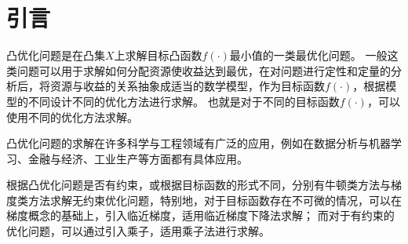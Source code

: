 \section{引言}
凸优化问题是在凸集$X$上求解目标凸函数$f(\cdot)$最小值的一类最优化问题。
一般这类问题可以用于求解如何分配资源使收益达到最优，在对问题进行定性和定量的分析后，将资源与收益的关系抽象成适当的数学模型，作为目标函数$f(\cdot)$，根据模型的不同设计不同的优化方法进行求解。
也就是对于不同的目标函数$f(\cdot)$，可以使用不同的优化方法求解。

凸优化问题的求解在许多科学与工程领域有广泛的应用，例如在数据分析与机器学习、金融与经济、工业生产等方面都有具体应用。

根据凸优化问题是否有约束，或根据目标函数的形式不同，分别有牛顿类方法与梯度类方法求解无约束优化问题，特别地，对于目标函数存在不可微的情况，可以在梯度概念的基础上，引入临近梯度，适用临近梯度下降法求解；
而对于有约束的优化问题，可以通过引入乘子，适用乘子法进行求解。